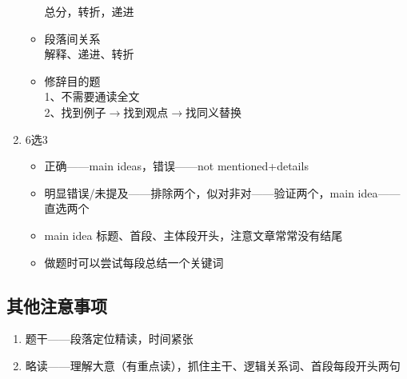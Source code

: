 \documentclass[UTF8]{ctexart}
\begin{document}
\begin{enumerate}[A]
\begin{itemize}
    总分，转折，递进
    \item 段落间关系\\
    解释、递进、转折
    \item 修辞目的题\\
1、不需要通读全文\\
2、找到例子$\rightarrow$找到观点$\rightarrow$找同义替换\\
  \end{itemize}
  \item 6选3\\
  \begin{itemize}
    \item 正确——main ideas，错误——not mentioned+details
    \item 明显错误/未提及——排除两个，似对非对——验证两个，main idea——直选两个
    \item main idea 标题、首段、主体段开头，注意文章常常没有结尾
    \item 做题时可以尝试每段总结一个关键词
  \end{itemize}
\end{enumerate}
\subsection{其他注意事项}
\begin{enumerate}[A]
  \item 题干——段落定位精读，时间紧张
  \item 略读——理解大意（有重点读），抓住主干、逻辑关系词、首段每段开头两句
\end{enumerate}
\end{document}
